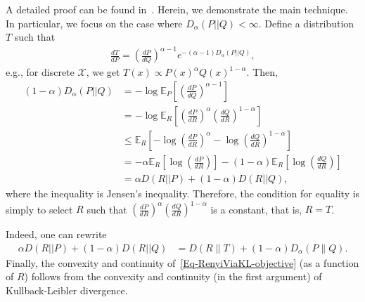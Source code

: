 \documentclass{article}
\numberwithin{theorem}{section}
\numberwithin{example}{section}
\numberwithin{remark}{section}
\numberwithin{definition}{section}
\newcommand{\E}{\mathbb{E}}
\newcommand{\X}{\mathcal{X}}
\begin{document}
A detailed proof can be found in~\cite[Theorem 30]{renyiDiv}. Herein, we demonstrate the main technique. In particular, we focus on the case where $D_\alpha (P ||Q) < \infty$. Define a distribution $T$ such that 
\begin{align}
    \frac{dT}{dP} = \left(\frac{dP}{dQ}\right)^{\alpha-1} e^{-(\alpha-1)D_\alpha(P||Q)},
\end{align}
e.g., for discrete $\X$, we get $T(x) \propto P(x)^\alpha Q(x)^{1-\alpha}$. Then,
\begin{align}
   (1-\alpha) D_\alpha(P||Q) 
   & = - \log \E_{P}  \left[ \left( \frac{dP}{dQ} \right)^{\alpha-1} \right] \\
   &= - \log \E_R \left[ \left( \frac{dP}{dR} \right)^\alpha \left( \frac{dQ}{dR} \right)^{1-\alpha} \right]\\
    &\leq \E_R \left[- \log  \left( \frac{dP}{dR} \right)^\alpha - \log \left( \frac{dQ}{dR} \right)^{1-\alpha}\right]
    \\
    &= - \alpha \E_R \left[ \log \left( \frac{dP}{dR} \right)\right] - (1- \alpha)\E_R \left[ \log \left( \frac{dQ}{dR} \right) \right] \\
    &= \alpha D(R||P) + (1 - \alpha)D(R||Q),\label{Eq-RenyiViaKL-objective}
    \end{align}
    where the inequality is Jensen's inequality. 
    Therefore, the condition for equality is simply to select $R$ such that $ \left( \frac{dP}{dR} \right)^\alpha \left( \frac{dQ}{dR} \right)^{1-\alpha}$ is a constant, that is, $R = T$.

    Indeed, one can rewrite
         \begin{align}
      \alpha D(R||P) + (1 - \alpha)D(R||Q) &=  D(R\| T) + (1- \alpha)D_\alpha(P\|Q).
     \end{align}       
 Finally, the convexity and continuity of~\eqref{Eq-RenyiViaKL-objective} (as a function of $R$) follows from the convexity and continuity (in the first argument) of Kullback-Leibler divergence. 
\end{document}
